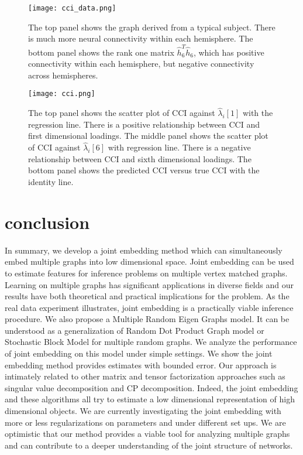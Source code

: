 \documentclass[10pt,journal,compsoc]{IEEEtran}
\begin{document}
\begin{figure}[!htbp]
	\centering
	\texttt{[image: cci\_data.png]}
	\caption{The top panel shows the graph derived from a typical subject. There is much more neural connectivity within each hemisphere. The bottom panel shows the rank one matrix $\hat{h}_6^T\hat{h}_6$, which has positive  connectivity within each hemisphere, but negative  connectivity across hemispheres.  }
	\label{fig:cci1}
\end{figure} 

\begin{figure}[!htbp]
	\centering
	\texttt{[image: cci.png]}
	\caption{The top panel shows the scatter plot of CCI against $\hat{\lambda}_i[1]$ with the regression line. There is a positive relationship between CCI and first dimensional loadings. The middle panel shows the scatter plot of CCI against $\hat{\lambda}_i[6]$ with regression line. There is a negative relationship between CCI and sixth dimensional loadings. The bottom panel shows the predicted CCI versus true CCI with the identity line.}
	\label{fig:cci}
\end{figure}


\section{conclusion}
In summary, we develop a joint embedding method which can simultaneously embed multiple graphs into low dimensional space. Joint embedding can
be used to estimate features for inference problems on multiple vertex matched graphs. Learning on multiple graphs has significant applications in diverse fields and our results have both theoretical and practical implications for the problem. As the real data experiment illustrates, joint embedding is a practically viable inference procedure. We also propose a Multiple Random Eigen Graphs model. It can be understood as a generalization of Random Dot Product Graph model or Stochastic Block Model for multiple random graphs. We analyze the performance of joint embedding on this model under simple settings. We show the joint embedding method provides estimates with bounded error. Our approach is intimately related to other matrix and tensor factorization approaches such as singular value decomposition and CP decomposition. Indeed, the joint embedding and these algorithms all try to estimate a low dimensional representation of high dimensional objects. We are currently investigating the joint embedding with more or less regularizations on parameters and under different set ups. We are optimistic that our method provides a viable tool for analyzing multiple graphs and can contribute to a deeper understanding of the joint structure of networks.
\end{document}
